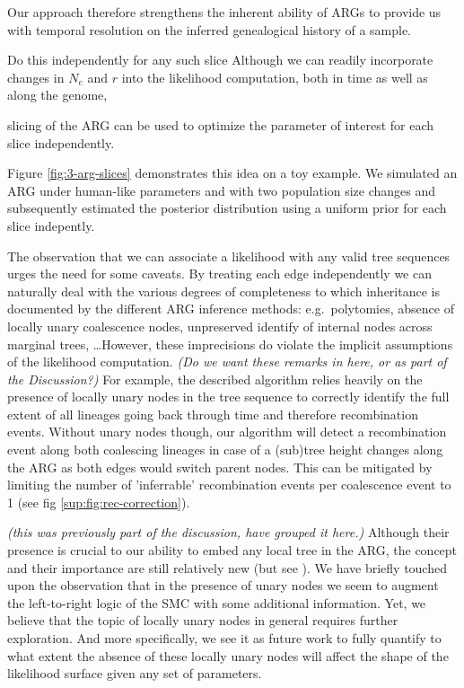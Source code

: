 \documentclass{article}
\newcommand{\comment}[1]{{\it \color{orange} (#1)}}
\begin{document}
Our approach therefore strengthens
the inherent ability of ARGs to provide us with temporal
resolution on the inferred genealogical history of a sample.

Do this independently for any such slice
Although we can readily incorporate changes in $N_e$ and $r$
into the likelihood computation, both in time as well as along the genome,


slicing of the ARG can be used to optimize the parameter of interest
for each slice independently.


Figure \ref{fig:3-arg-slices} demonstrates this idea on a toy example.
We simulated an ARG under human-like parameters and with
two population size changes and subsequently estimated the posterior
distribution using a uniform prior for each slice indepently.


The observation that we can associate a likelihood with any valid tree sequences
urges the need for some caveats. By treating each edge independently we can
naturally deal with the various degrees of completeness to which inheritance
is documented by the different ARG inference methods: e.g.\ polytomies, absence
of locally unary coalescence nodes, unpreserved identify of internal nodes
across marginal trees, \dots However, these imprecisions do violate the implicit
assumptions of the likelihood computation.
\comment{Do we want these remarks in here, or as part of the Discussion?}
For example, the described algorithm relies heavily on the
presence of locally unary nodes in the tree sequence to correctly identify the
full extent of all lineages going back through time and therefore recombination
events. Without unary nodes though, our algorithm will detect a recombination
event along both coalescing lineages in case of a (sub)tree height changes along
the ARG as both edges would switch parent nodes. This can be mitigated by limiting
the number of 'inferrable' recombination events per coalescence event to 1
(see fig \ref{sup:fig:rec-correction}).

\comment{this was previously part of the discussion, have grouped it here.}
Although their presence is crucial to our ability to embed any local tree in the
ARG, the concept and their importance are still relatively new (but see
\citet{wong_general_2023}).
We have briefly touched upon the observation that in
the presence of unary nodes we seem to augment the left-to-right logic of the SMC
with some additional information. Yet, we believe that the topic of locally
unary nodes in general requires further exploration.
And more specifically, we see it as future work to fully quantify to what
extent the absence of these locally unary nodes will affect the shape of the
likelihood surface given any set of parameters.
\end{document}
